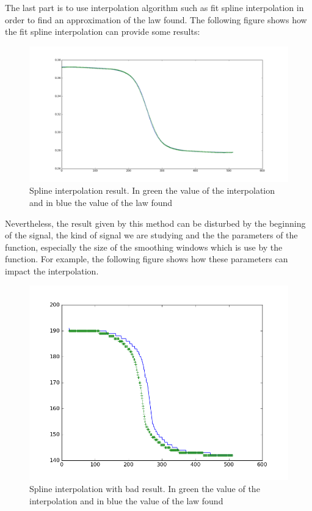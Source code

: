 The last part is to use interpolation algorithm such as fit spline interpolation in order to find an approximation of the law found. The following figure shows how the fit spline interpolation can provide some results:

\begin{figure}[H]
\centering
    \includegraphics[scale=0.35,angle=0]{Images/spline_pour_la_loi_de_frequence_trouvee.png}
    \caption{Spline interpolation result. In green the value of the interpolation and in blue the value of the law found}
    \label{fig:spline_pour_la_loi_de_frequence_trouvee}
\end{figure}

Nevertheless, the result given by this method can be disturbed by the beginning of the signal, the kind of signal we are studying and the the parameters of the function, especially the size of the smoothing windows which is use by the function. For example, the following figure shows how these parameters can impact the interpolation.

\begin{figure}[H]
\centering
    \includegraphics[scale=0.6,angle=0]{Images/spline_pour_la_loi_de_frequence_trouvee2.png}
    \caption{Spline interpolation with bad result. In green the value of the interpolation and in blue the value of the law found}
    \label{fig:spline_pour_la_loi_de_frequence_trouvee2}
\end{figure}

